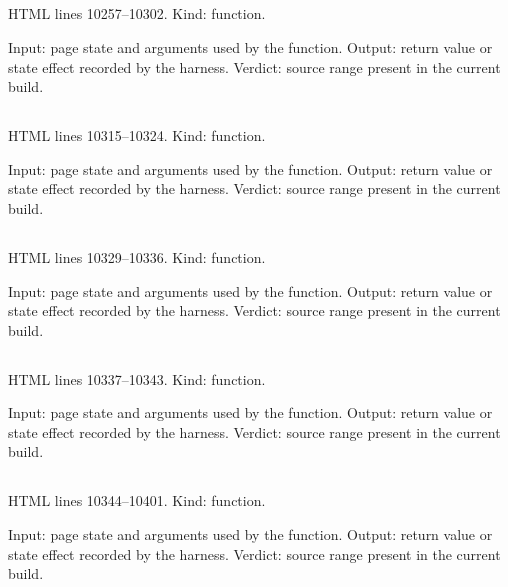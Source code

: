 \subsection*{\texttt{}}
\label{vf_564_parseCqTable}
HTML lines 10257--10302. Kind: function.

Input: page state and arguments used by the function.
Output: return value or state effect recorded by the harness.
Verdict: source range present in the current build.

\subsection*{\texttt{}}
\label{vf_565_acceptPasted}
HTML lines 10315--10324. Kind: function.

Input: page state and arguments used by the function.
Output: return value or state effect recorded by the harness.
Verdict: source range present in the current build.

\subsection*{\texttt{}}
\label{vf_566_refreshAll}
HTML lines 10329--10336. Kind: function.

Input: page state and arguments used by the function.
Output: return value or state effect recorded by the harness.
Verdict: source range present in the current build.

\subsection*{\texttt{}}
\label{vf_567_showTab}
HTML lines 10337--10343. Kind: function.

Input: page state and arguments used by the function.
Output: return value or state effect recorded by the harness.
Verdict: source range present in the current build.

\subsection*{\texttt{}}
\label{vf_568_boot}
HTML lines 10344--10401. Kind: function.

Input: page state and arguments used by the function.
Output: return value or state effect recorded by the harness.
Verdict: source range present in the current build.

